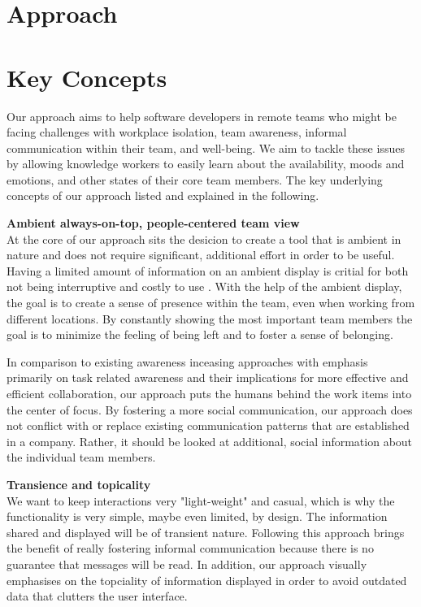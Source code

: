 \chapter{Approach}
\label{chapter:approach}



\chapter{Key Concepts}
Our approach aims to help software developers in remote teams who might be facing challenges with workplace isolation, team awareness, informal communication within their team, and well-being. We aim to tackle these issues by allowing knowledge workers to easily learn about the availability, moods and emotions, and other states of their core team members. The key underlying concepts of our approach listed and explained in the following.

\medskip\noindent\textbf{Ambient always-on-top, people-centered team view} \\
At the core of our approach sits the desicion to create a tool that is ambient in nature and does not require significant, additional effort in order to be useful. Having a limited amount of information on an ambient display is critial for both not being interruptive and costly to use \autocite{dabbish2004controlling}. With the help of the ambient display, the goal is to create a sense of presence within the team, even when working from different locations. By constantly showing the most important team members the goal is to minimize the feeling of being left and to foster a sense of belonging.

In comparison to existing awareness inceasing approaches with emphasis primarily on task related awareness and their implications for more effective and efficient collaboration, our approach puts the humans behind the work items into the center of focus. By fostering a more social communication, our approach does not conflict with or replace existing communication patterns that are established in a company. Rather, it should be looked at additional, social information about the individual team members.

\medskip\noindent\textbf{Transience and topicality} \\
We want to keep interactions very "light-weight" and casual, which is why the functionality is very simple, maybe even limited, by design. The information shared and displayed will be of transient nature. Following this approach brings the benefit of really fostering informal communication because there is no guarantee that messages will be read. In addition, our approach visually emphasises on the topciality of information displayed in order to avoid outdated data that clutters the user interface.

